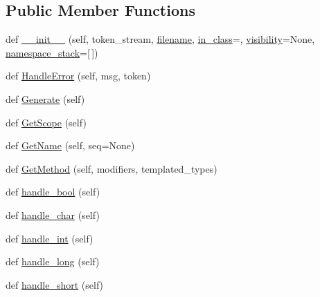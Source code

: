 \subsection*{Public Member Functions}
\begin{DoxyCompactItemize}
\item 
def \mbox{\hyperlink{classcpp_1_1ast_1_1_ast_builder_aaf35e2f9d395c99a38e6bb6f9b5dd047}{\+\_\+\+\_\+init\+\_\+\+\_\+}} (self, token\+\_\+stream, \mbox{\hyperlink{classcpp_1_1ast_1_1_ast_builder_ad8b8f5788de55d6c7151e82af8b21115}{filename}}, \mbox{\hyperlink{classcpp_1_1ast_1_1_ast_builder_a9edc1e10a3f005b463fd9316d83dd15d}{in\+\_\+class}}=\textquotesingle{}\textquotesingle{}, \mbox{\hyperlink{classcpp_1_1ast_1_1_ast_builder_a2f16b19846c405101235432d2666b614}{visibility}}=None, \mbox{\hyperlink{classcpp_1_1ast_1_1_ast_builder_ab183aa48e4b6e116379f95eb3d11039c}{namespace\+\_\+stack}}=\mbox{[}$\,$\mbox{]})
\item 
def \mbox{\hyperlink{classcpp_1_1ast_1_1_ast_builder_a3e610662018d674f6c57ef19254cc470}{Handle\+Error}} (self, msg, token)
\item 
def \mbox{\hyperlink{classcpp_1_1ast_1_1_ast_builder_aebd0392eee56def849468af5b93b720a}{Generate}} (self)
\item 
def \mbox{\hyperlink{classcpp_1_1ast_1_1_ast_builder_add6826421ce64546a7dbb9b2e699a4d4}{Get\+Scope}} (self)
\item 
def \mbox{\hyperlink{classcpp_1_1ast_1_1_ast_builder_a327957c4228325fc5f64821b047bdc6f}{Get\+Name}} (self, seq=None)
\item 
def \mbox{\hyperlink{classcpp_1_1ast_1_1_ast_builder_af22fb880867876144d20818391ad267a}{Get\+Method}} (self, modifiers, templated\+\_\+types)
\item 
def \mbox{\hyperlink{classcpp_1_1ast_1_1_ast_builder_ac5a5e19e5be6501d351891cc0ead5f53}{handle\+\_\+bool}} (self)
\item 
def \mbox{\hyperlink{classcpp_1_1ast_1_1_ast_builder_adfbb93646d0d32b39a19f3c70cc031f8}{handle\+\_\+char}} (self)
\item 
def \mbox{\hyperlink{classcpp_1_1ast_1_1_ast_builder_a6f824335dd53e12a76d6f91ab69c627c}{handle\+\_\+int}} (self)
\item 
def \mbox{\hyperlink{classcpp_1_1ast_1_1_ast_builder_a08f56b25e6bed18aa955f8cad462d2f9}{handle\+\_\+long}} (self)
\item 
def \mbox{\hyperlink{classcpp_1_1ast_1_1_ast_builder_adf11f377386bdb44fe1094ff8adf9142}{handle\+\_\+short}} (self)
\item 

\end{DoxyCompactItemize}
